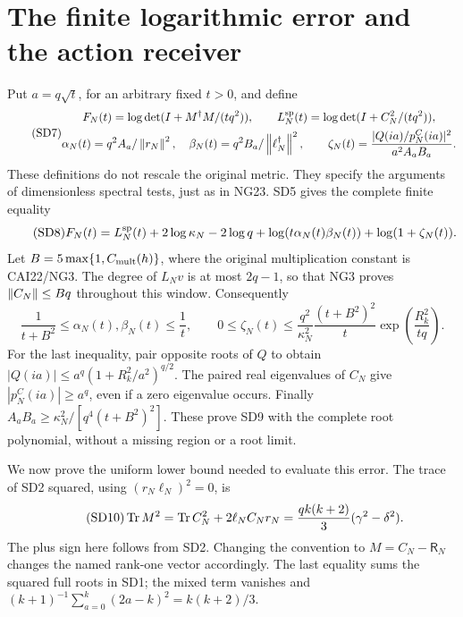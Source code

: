 \section{The finite logarithmic error and the action receiver}
Put $a=q\sqrt t$, for an arbitrary fixed $t>0$, and define
\begin{equation}\tag{SD7}
\begin{gathered}
F_N(t)=\log\det(I+M^\dagger M/(tq^2)),\qquad
L_N^{\rm sp}(t)=\log\det(I+C_N^2/(tq^2)),\\
\alpha_N(t)=q^2 A_a/\left\lVert r_N\right\rVert^2,\quad
\beta_N(t)=q^2 B_a/\left\lVert\ell_N^\dagger\right\rVert^2,\qquad
\zeta_N(t)=\frac{|Q(ia)/p_N^C(ia)|^2}{a^2A_aB_a}.
\end{gathered}
\end{equation}
These definitions do not rescale the original metric. They specify the
arguments of dimensionless spectral tests, just as in NG23.
SD5 gives the complete finite equality
\begin{equation}\tag{SD8}
F_N(t)=L_N^{\rm sp}(t)+2\log\kappa_N-2\log q
+\log(t\alpha_N(t)\beta_N(t))+\log(1+\zeta_N(t)).
\end{equation}
Let $B=5\max\{1,C_{\rm mult}(h)\}$, where the original multiplication
constant is CAI22/NG3. The degree of $L_Nv$ is at most $2q-1$, so that
NG3 proves $\left\lVert C_N\right\rVert\le Bq$ throughout this window. Consequently
\begin{equation}\tag{SD9}
\frac1{t+B^2}\le\alpha_N(t),\beta_N(t)\le\frac1t,
\qquad
0\le\zeta_N(t)\le
\frac{q^2}{\kappa_N^2}\frac{(t+B^2)^2}{t}
\exp\!\left(\frac{R_k^2}{tq}\right).
\end{equation}
For the last inequality, pair opposite roots of $Q$ to obtain
$|Q(ia)|\le a^q(1+R_k^2/a^2)^{q/2}$. The paired real eigenvalues of
$C_N$ give $|p_N^C(ia)|\ge a^q$, even if a zero eigenvalue occurs.
Finally $A_aB_a\ge\kappa_N^2/[q^4(t+B^2)^2]$. These prove SD9 with
the complete root polynomial, without a missing region or a root limit.

We now prove the uniform lower bound needed to evaluate this error.
The trace of SD2 squared, using $(r_N\ell_N)^2=0$, is
\begin{equation}\tag{SD10}
\operatorname{Tr} M^2=\operatorname{Tr} C_N^2+2\ell_N C_Nr_N
=\frac{qk(k+2)}3(\gamma^2-\delta^2).
\end{equation}
The plus sign here follows from SD2. Changing the convention to
$M=C_N-\mathsf R_N$ changes the named rank-one vector accordingly.
The last equality sums the squared full roots in SD1; the mixed term
vanishes and $(k+1)^{-1}\sum_{a=0}^k(2a-k)^2=k(k+2)/3$.


